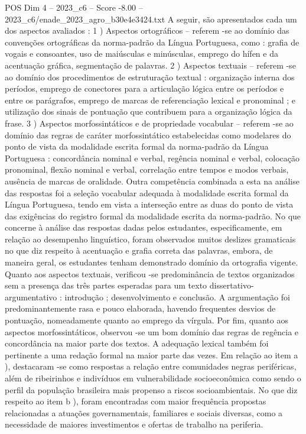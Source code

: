 \begin{textsample}{POS Dim 4 – 2023\_c6 – Score -8.00 – 2023\_c6/enade\_2023\_agro\_b30e4e3424.txt}
A seguir, são apresentados cada um dos aspectos avaliados : 1 ) Aspectos ortográficos – referem -se ao domínio das convenções ortográficas da norma-padrão da Língua Portuguesa, como : grafia de vogais e consoantes, uso de maiúsculas e minúsculas, emprego do hífen e da acentuação gráfica, segmentação de palavras. 2 ) Aspectos textuais – referem -se ao domínio dos procedimentos de estruturação textual : organização interna dos períodos, emprego de conectores para a articulação lógica entre os períodos e entre os parágrafos, emprego de marcas de referenciação lexical e pronominal ; e utilização dos sinais de pontuação que contribuem para a organização lógica da frase. 3 ) Aspectos morfossintáticos e de propriedade vocabular – referem -se ao domínio das regras de caráter morfossintático estabelecidas como modelares do ponto de vista da modalidade escrita formal da norma-padrão da Língua Portuguesa : concordância nominal e verbal, regência nominal e verbal, colocação pronominal, flexão nominal e verbal, correlação entre tempos e modos verbais, ausência de marcas de oralidade.
Outra competência combinada a esta na análise das respostas foi a seleção vocabular adequada à modalidade escrita formal da Língua Portuguesa, tendo em vista a interseção entre as duas do ponto de vista das exigências do registro formal da modalidade escrita da norma-padrão.
No que concerne à análise das respostas dadas pelos estudantes, especificamente, em relação ao desempenho linguístico, foram observados muitos deslizes gramaticais no que diz respeito à acentuação e grafia correta das palavras, embora, de maneira geral, os estudantes tenham demonstrado domínio da ortografia vigente.
Quanto aos aspectos textuais, verificou -se predominância de textos organizados sem a presença das três partes esperadas para um texto dissertativo-argumentativo : introdução ; desenvolvimento e conclusão.
A argumentação foi predominantemente rasa e pouco elaborada, havendo frequentes desvios de pontuação, nomeadamente quanto ao emprego da vírgula.
Por fim, quanto aos aspectos morfossintáticos, observou -se um bom domínio das regras de regência e concordância na maior parte dos textos.
A adequação lexical também foi pertinente a uma redação formal na maior parte das vezes.
Em relação ao item a ), destacaram -se como respostas a relação entre comunidades negras periféricas, além de ribeirinhos e indivíduos em vulnerabilidade socioeconômica como sendo o perfil da população brasileira mais propenso a riscos socioambientais.
No que diz respeito ao item b ), foram encontradas com maior frequência propostas relacionadas a atuações governamentais, familiares e sociais diversas, como a necessidade de maiores investimentos e ofertas de trabalho na periferia.

\end{textsample}
